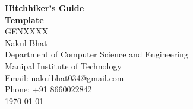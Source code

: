 \newcommand{\titlepagebreak}{\\[1em]}
\begin{titlepage}
    \vspace*{\fill} %

    \centering
    {\Huge \bfseries Hitchhiker's Guide\titlepagebreak{} Template}\\[1in]
    
    {\Large GENXXXX}\\[0.75in]
    
    {\huge Nakul Bhat}\\[0.5in]
    
    {\large Department of Computer Science and Engineering \titlepagebreak{} Manipal Institute of Technology}\\[0.5in]
    
    {\large Email: nakulbhat034@gmail.com \titlepagebreak{} Phone: +91 8660022842}\\[1.5cm]
    
    {\large \today}\\[0.5cm]
    
    \vspace*{\fill} %
\end{titlepage}
\restoregeometry{}